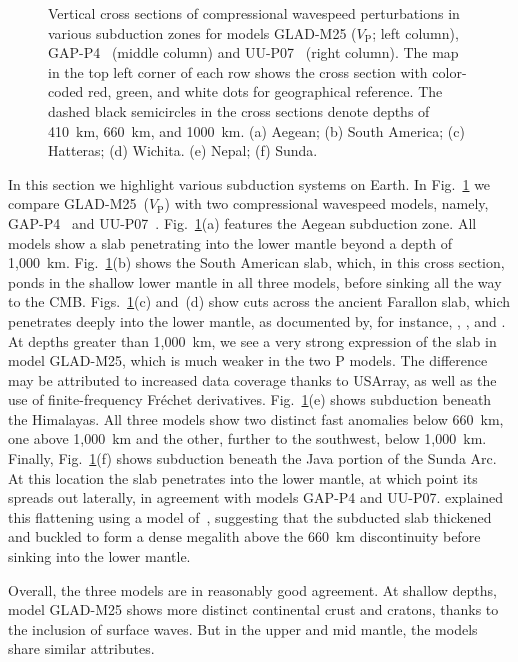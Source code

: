 \documentclass[extra,mreferee]{gji}
\begin{document}
\begin{figure}
    \caption{\small{Vertical cross sections of compressional wavespeed perturbations in various subduction zones
    for models GLAD-M25 ($V_\textrm{P}$; left column), GAP-P4~\citep{fukao2013subducted} (middle column) and UU-P07~\citep{van2018atlas} (right column).
    The map in the top left corner of each row shows the cross section with color-coded red, green, and white dots for geographical reference.
    The dashed black semicircles in the cross sections denote depths of 410~km, 660~km, and 1000~km.
    (a) Aegean; (b) South America; (c) Hatteras; (d) Wichita. (e) Nepal; (f) Sunda. }}
    \label{fig:subd}
\end{figure}

In this section we highlight various subduction systems on Earth.
In Fig.~\ref{fig:subd} we compare GLAD-M25~($V_\textrm{P}$) with two compressional wavespeed models,
namely, GAP-P4~\citep{fukao2013subducted} and UU-P07~\citep{van2018atlas}.
Fig.~\ref{fig:subd}(a) features the Aegean subduction zone. All models show a slab penetrating into the lower mantle beyond a depth of 1,000~km.
Fig.~\ref{fig:subd}(b) shows the South American slab, which, in this cross section, ponds in the shallow lower mantle in all three models, before sinking all the way to the CMB.
Figs.~\ref{fig:subd}(c) and~(d) show cuts across the ancient Farallon slab, which penetrates deeply into the lower mantle,
as documented by, for instance, \citet{grand1994}, \cite{hilst1997}, and \cite{grand1997high}.
At depths greater than 1,000~km, 
we see a very strong expression of the slab in model GLAD-M25, which is much weaker in the two P models.
The difference may be attributed to increased data coverage thanks to USArray, as well as the use of finite-frequency Fr\'echet derivatives.
Fig.~\ref{fig:subd}(e) shows subduction beneath the Himalayas.
All three models show two distinct fast anomalies below 660~km,
one above 1,000~km and the other, further to the southwest, below 1,000~km.
Finally, Fig.~\ref{fig:subd}(f) shows subduction beneath the Java portion of the Sunda Arc.
At this location the slab penetrates into the lower mantle, at which point its spreads out laterally,
in agreement with models GAP-P4 and UU-P07.
\cite{fukao1992} explained this flattening using a model of~\cite{ringwood1988},
suggesting that the subducted slab thickened and buckled to form a dense megalith
above the 660~km discontinuity before sinking into the lower mantle.

Overall, the three models are in reasonably good agreement.
At shallow depths, model GLAD-M25 shows more distinct continental crust and cratons, thanks to the inclusion of surface waves.
But in the upper and mid mantle,
the models share similar attributes.
\end{document}
